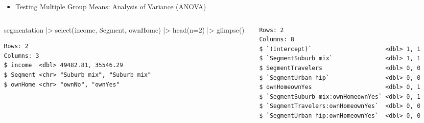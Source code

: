 \documentclass[
  ignorenonframetext,
]{beamer}
\newenvironment{Shaded}{\begin{snugshade}}{\end{snugshade}}
\newcommand{\AttributeTok}[1]{\textcolor[rgb]{0.40,0.45,0.13}{#1}}
\newcommand{\DecValTok}[1]{\textcolor[rgb]{0.68,0.00,0.00}{#1}}
\newcommand{\FunctionTok}[1]{\textcolor[rgb]{0.28,0.35,0.67}{#1}}
\newcommand{\NormalTok}[1]{\textcolor[rgb]{0.00,0.23,0.31}{#1}}
\newcommand{\OtherTok}[1]{\textcolor[rgb]{0.00,0.23,0.31}{#1}}
\newcommand{\SpecialCharTok}[1]{\textcolor[rgb]{0.37,0.37,0.37}{#1}}
\providecommand{\tightlist}{%
  \setlength{\itemsep}{0pt}\setlength{\parskip}{0pt}}\usepackage{longtable,booktabs,array}
\begin{document}
\begin{frame}[fragile]{}
\label{section-34}
\begin{itemize}
\tightlist
\item
  Testing Multiple Group Means: Analysis of Variance (ANOVA)
\end{itemize}

\tiny

\begin{columns}[T]
\begin{column}{0.4\textwidth}
\begin{Shaded}
\begin{Highlighting}[]
\NormalTok{segmentation }\SpecialCharTok{|\textgreater{}} 
  \FunctionTok{select}\NormalTok{(income, Segment, ownHome) }\SpecialCharTok{|\textgreater{}} 
  \FunctionTok{head}\NormalTok{(}\AttributeTok{n=}\DecValTok{2}\NormalTok{) }\SpecialCharTok{|\textgreater{}} 
  \FunctionTok{glimpse}\NormalTok{()}
\end{Highlighting}
\end{Shaded}

\begin{verbatim}
Rows: 2
Columns: 3
$ income  <dbl> 49482.81, 35546.29
$ Segment <chr> "Suburb mix", "Suburb mix"
$ ownHome <chr> "ownNo", "ownYes"
\end{verbatim}
\end{column}

\begin{column}{0.5\textwidth}
\begin{Shaded}
\end{Shaded}

\begin{verbatim}
Rows: 2
Columns: 8
$ `(Intercept)`                     <dbl> 1, 1
$ `SegmentSuburb mix`               <dbl> 1, 1
$ SegmentTravelers                  <dbl> 0, 0
$ `SegmentUrban hip`                <dbl> 0, 0
$ ownHomeownYes                     <dbl> 0, 1
$ `SegmentSuburb mix:ownHomeownYes` <dbl> 0, 1
$ `SegmentTravelers:ownHomeownYes`  <dbl> 0, 0
$ `SegmentUrban hip:ownHomeownYes`  <dbl> 0, 0
\end{verbatim}
\end{column}
\end{columns}
\end{frame}
\end{document}
